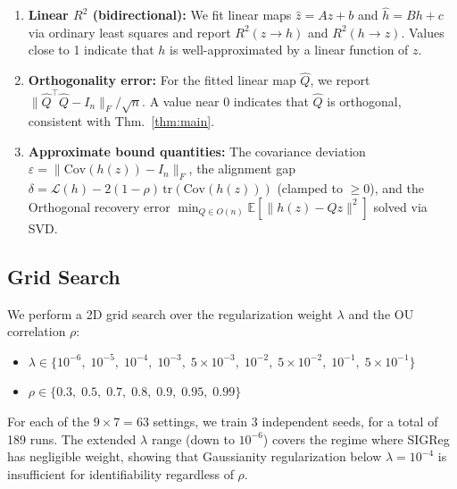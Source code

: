 \begin{enumerate}
    \item \textbf{Linear $R^2$ (bidirectional):} We fit linear maps $\hat{z} = Az + b$ and $\hat{h} = Bh + c$ via ordinary least squares and report $R^2(z \to h)$ and $R^2(h \to z)$. Values close to 1 indicate that $h$ is well-approximated by a linear function of $z$.

    \item \textbf{Orthogonality error:} For the fitted linear map $\hat Q$, we report $\|\hat Q^\top \hat Q - I_n\|_F / \sqrt{n}$. A value near 0 indicates that $\hat Q$ is orthogonal, consistent with Thm.~\ref{thm:main}.

    \item \textbf{Approximate bound quantities:} The covariance deviation $\varepsilon = \|\mathrm{Cov}(h(z)) - I_n\|_F$, the alignment gap $\delta = \mathcal{L}(h) - 2(1-\rho)\,\mathrm{tr}(\mathrm{Cov}(h(z)))$ (clamped to $\geq 0$), and the Orthogonal recovery error $\min_{Q \in O(n)} \mathbb{E}[\|h(z) - Qz\|^2]$ solved via SVD.
\end{enumerate}



\subsection{Grid Search}\label{app:grid}

We perform a 2D grid search over the regularization weight $\lambda$ and the OU correlation $\rho$:
\begin{itemize}
    \item $\lambda \in \{10^{-6},\; 10^{-5},\; 10^{-4},\; 10^{-3},\; 5 \times 10^{-3},\; 10^{-2},\; 5 \times 10^{-2},\; 10^{-1},\; 5 \times 10^{-1}\}$
    \item $\rho \in \{0.3,\; 0.5,\; 0.7,\; 0.8,\; 0.9,\; 0.95,\; 0.99\}$
\end{itemize}
For each of the $9 \times 7 = 63$ settings, we train 3 independent seeds, for a total of 189 runs.
The extended $\lambda$ range (down to $10^{-6}$) covers the regime where SIGReg has negligible weight, showing that Gaussianity regularization below $\lambda = 10^{-4}$ is insufficient for identifiability regardless of $\rho$.

